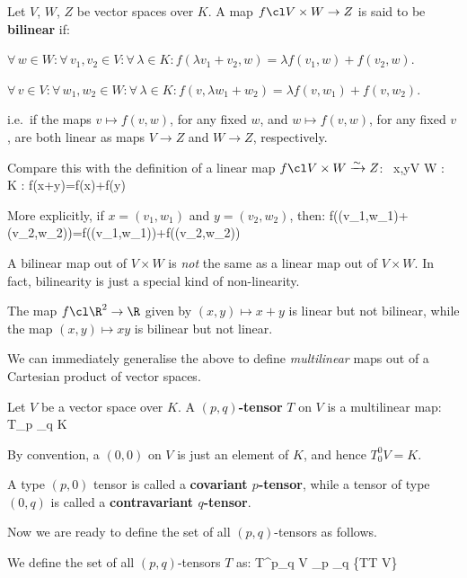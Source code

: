 Let $V$, $W$, $Z$ be vector spaces over $K$. A map $f\cl V\times W \to Z$ is said to be \textbf{bilinear} if:
\bit
\item $\forall \, w\in W:\forall \, v_1,v_2\in V: \forall \,\lambda \in K : f(\lambda v_1+v_2,w)=\lambda f(v_1,w) +
f(v_2,w).$
\item $\forall \, v\in V:\forall \, w_1,w_2\in W: \forall \,\lambda \in K : f(v,\lambda w_1+w_2)=\lambda f(v,w_1) +
f(v,w_2).$
\eit

i.e.\ if the maps $v\mapsto f(v,w)$, for any fixed $w$, and $w\mapsto f(v,w)$, for any fixed $v$, are both linear as
maps $V\to Z$ and $W\to Z$, respectively.
\ed

Compare this with the definition of a linear map $f\cl V\times W \xrightarrow{\sim} Z$:
\bse
\forall \, x,y\in V \times W : \forall \, \lambda \in K : f(\lambda x+y)=\lambda f(x)+f(y)
\ese

More explicitly, if $x=(v_1,w_1)$ and $y = (v_2,w_2)$, then:
\bse
f(\lambda (v_1,w_1)+(v_2,w_2))=\lambda f((v_1,w_1))+f((v_2,w_2))
\ese

A bilinear map out of $V\times W$ is \emph{not} the same as a linear map out of $V\times W$. In fact, bilinearity is
just a special kind of non-linearity.

\be
The map $f\cl \R^2\to \R$ given by $(x,y)\mapsto x+y$ is linear but not bilinear, while the map $(x,y)\mapsto xy$ is
bilinear but not linear.
\ee

We can immediately generalise the above to define \emph{multilinear} maps out of a Cartesian product of vector spaces.

\bd [Tensors]
Let $V$ be a vector space over $K$. A \textbf{$(p,q)$-tensor} $T$ on $V$ is a multilinear map:
\bse
T\cl {}_{p } \times
{}_{q} \to K
\ese
\ed

By convention, a $(0,0)$ on $V$ is just an element of $K$, and hence $T^0_0 V=K$.

A type $(p,0)$ tensor is called a \textbf{covariant $p$-tensor}, while a tensor of type $(0,q)$ is called a
\textbf{contravariant $q$-tensor}.
\ed

Now we are ready to define the set of all $(p,q)$-tensors as follows.

\bd [$T^p_q V$]
We define the set of all $(p,q)$-tensors $T$ as:
\bse
T^p_q V \coloneqq {}_{p } \otimes {}_{q } \coloneqq \{T\mid T V\}
\ese
\ed

